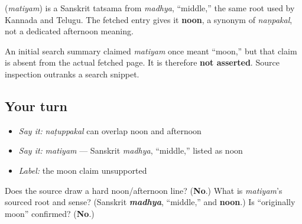 \begin{cousinweb}
\textbf{} (\emph{matiyam}) is a Sanskrit tatsama from \emph{madhya}, \textquotedblleft{}middle,\textquotedblright{} the same root used by Kannada and Telugu. The fetched entry gives it \textbf{noon}, a synonym of \emph{naṇpakal}, not a dedicated afternoon meaning.

An initial search summary claimed \emph{matiyam} once meant \textquotedblleft{}moon,\textquotedblright{} but that claim is absent from the actual fetched page. It is therefore \textbf{not asserted}. Source inspection outranks a search snippet.
\end{cousinweb}

\subsection*{Your turn}
\begin{itemize}
\raggedright
  \item \emph{Say it:} \emph{naṭuppakal} can overlap noon and afternoon
  \item \emph{Say it:} \emph{matiyam} — Sanskrit \emph{madhya}, \textquotedblleft{}middle,\textquotedblright{} listed as noon
  \item \emph{Label:} the moon claim unsupported
\end{itemize}

\begin{tcolorbox}[breakable,colback=teal!4,colframe=teal!35!black,title={Before you move on}]
Does the source draw a hard noon/afternoon line? (\textbf{No}.) What is \emph{matiyam}'s sourced root and sense? (Sanskrit \emph{\textbf{madhya}}, \textquotedblleft{}middle,\textquotedblright{} and \textbf{noon}.) Is \textquotedblleft{}originally moon\textquotedblright{} confirmed? (\textbf{No}.)
\end{tcolorbox}
